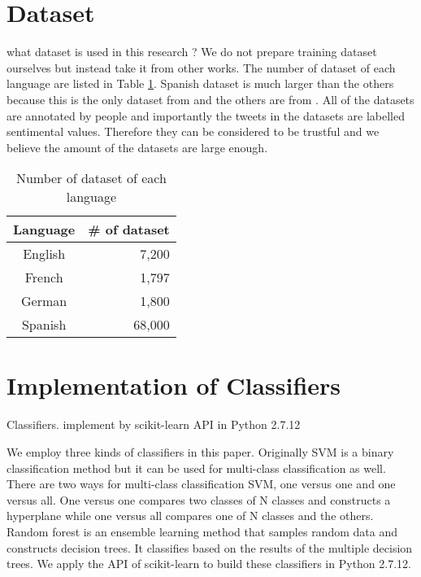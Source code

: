 \section{Dataset}\label{sec:dataset}
what dataset is used in this research ?
We do not prepare training dataset ourselves but instead take it from other works.
The number of dataset of each language are listed in Table \ref{tab:dataset}.
Spanish dataset is much larger than the others because this is the only dataset from \cite{dataset_spanish} and the others are from \cite{dataset}.
All of the datasets are annotated by people and importantly the tweets in the datasets are labelled sentimental values.
Therefore they can be considered to be trustful and we believe the amount of the datasets are large enough.

\begin{table}[ht]
	\caption{Number of dataset of each language}
	\centering
	\begin{tabular}{|c|r|} \hline
	Language & \# of dataset \\ \hline \hline
	English & 7,200  \\ \hline
	French & 1,797  \\ \hline
	German & 1,800  \\ \hline
	Spanish & 68,000  \\ \hline
	\end{tabular}
	\label{tab:dataset}
\end{table}


\section{Implementation of Classifiers}
Classifiers.
implement by scikit-learn API in Python 2.7.12

We employ three kinds of classifiers in this paper.
Originally SVM is a binary classification method but it can be used for multi-class classification as well.
There are two ways for multi-class classification SVM, one versus one and one versus all.
One versus one compares two classes of N classes and constructs a hyperplane while one versus all compares one of N classes and the others.
Random forest is an ensemble learning method that samples random data and constructs decision trees.
It classifies based on the results of the multiple decision trees. 
We apply the API of scikit-learn \cite{scikit} to build these classifiers in Python 2.7.12.



